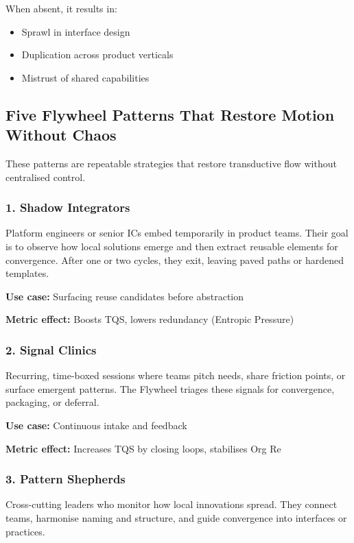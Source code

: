 \documentclass[12pt]{article}
\begin{document}
When absent, it results in:
\begin{itemize}
    \item Sprawl in interface design
    \item Duplication across product verticals
    \item Mistrust of shared capabilities
\end{itemize}

\subsection*{Five Flywheel Patterns That Restore Motion\\Without Chaos}

These patterns are repeatable strategies that restore transductive flow without centralised control.

\subsubsection*{1. Shadow Integrators}

Platform engineers or senior ICs embed temporarily in product teams. Their goal is to observe how local solutions emerge and then extract reusable elements for convergence. After one or two cycles, they exit, leaving paved paths or hardened templates.

\textbf{Use case:} Surfacing reuse candidates before abstraction

\textbf{Metric effect:} Boosts TQS, lowers redundancy (Entropic Pressure)

\subsubsection*{2. Signal Clinics}

Recurring, time-boxed sessions where teams pitch needs, share friction points, or surface emergent patterns. The Flywheel triages these signals for convergence, packaging, or deferral.

\textbf{Use case:} Continuous intake and feedback

\textbf{Metric effect:} Increases TQS by closing loops, stabilises Org Re

\subsubsection*{3. Pattern Shepherds}

Cross-cutting leaders who monitor how local innovations spread. They connect teams, harmonise naming and structure, and guide convergence into interfaces or practices.
\end{document}
